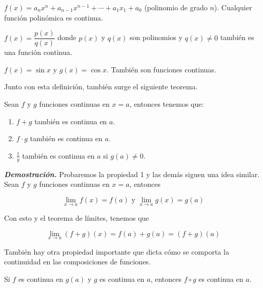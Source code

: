 \documentclass{report}
\begin{document}
    \begin{Example}
        $f(x) = a_nx^n + a_{n-1}x^{n-1}+\cdots + a_1x_1 + a_0$ (polinomio de grado $n$). Cualquier función polinómica es continua.
    \end{Example}

    \begin{Example}
        $f(x) = \dfrac{p(x)}{q(x)}$ donde $p(x)$ y $q(x)$ son polinomios y $q(x) \neq 0$ también es una función continua.
    \end{Example}

    \begin{Example}
        $f(x) = \sin x$ y $g(x) = \cos x$. También son funciones continuas.
    \end{Example}

    Junto con esta definición, también surge el siguiente teorema.\\

    \begin{thBox}
        Sean $f$ y $g$ funciones continuas en $x=a$, entonces tenemos que:

        \begin{enumerate}
            \item $f+g$ también es continua en $a$.
            \item $f \cdot g$ también es continua en $a$.
            \item $\frac{1}{g}$ también es continua en $a$ si $g(a) \neq 0$.
        \end{enumerate}
    \end{thBox}

    \textit{\textbf{Demostración.}} Probaremos la propiedad 1 y las demás siguen una idea similar. Sean $f$ y $g$ funciones continuas en $x=a$, entonces

    $$
        \lim_{x\to a} f(x) = f(a) \text{ y } \lim_{x\to a} g(x) = g(a)
    $$

    Con esto y el teorema de límites, tenemos que

    $$
        \lim_{x \to a} (f+g)(x) = f(a) + g(a) = (f+g)(a)
    $$

    También hay otra propiedad importante que dicta cómo se comporta la continuidad en las composiciones de funciones.\\

    \begin{thBox}
        Si $f$ es continua en $g(a)$ y $g$ es continua en $a$, entonces $f \circ g$ es continua en $a$.
    \end{thBox}
\end{document}
